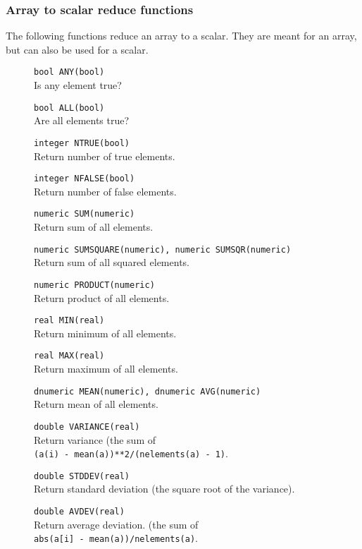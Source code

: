 \subsubsection{Array to scalar reduce functions}
The following functions reduce an array to a scalar.
They are meant for an array, but can also be used for a scalar.
\begin{description}
  \item[] \texttt{bool ANY(bool)}\\
    Is any element true?
  \item[] \texttt{bool ALL(bool)}\\
    Are all elements true?
  \item[] \texttt{integer NTRUE(bool)}\\
    Return number of true elements.
  \item[] \texttt{integer NFALSE(bool)}\\
    Return number of false elements.
  \item[] \texttt{numeric SUM(numeric)}\\
    Return sum of all elements.
  \item[] \texttt{numeric SUMSQUARE(numeric), numeric SUMSQR(numeric)}\\
    Return sum of all squared elements.
  \item[] \texttt{numeric PRODUCT(numeric)}\\
    Return product of all elements.
  \item[] \texttt{real MIN(real)}\\
    Return minimum of all elements.
  \item[] \texttt{real MAX(real)}\\
    Return maximum of all elements.
  \item[] \texttt{dnumeric MEAN(numeric), dnumeric AVG(numeric)}\\
    Return mean of all elements.
  \item[] \texttt{double VARIANCE(real)}\\
    Return variance (the sum of
    \\\texttt{(a(i) - mean(a))**2/(nelements(a) - 1)}.
  \item[] \texttt{double STDDEV(real)}\\
    Return standard deviation (the square root of the variance).
  \item[] \texttt{double AVDEV(real)}\\
    Return average deviation. (the sum of
    \\\texttt{abs(a[i] - mean(a))/nelements(a)}.

\end{description}
